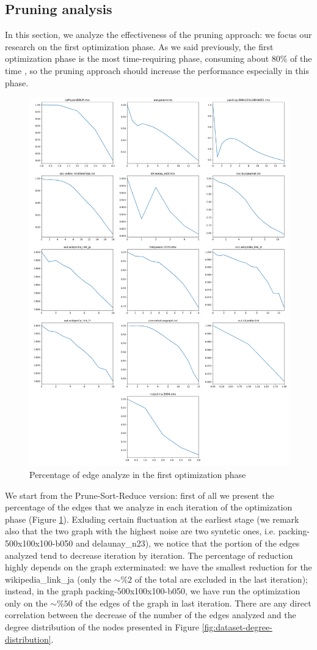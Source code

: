 \subsection{Pruning analysis}
In this section, we analyze the effectiveness of the pruning approach: we focus our research on the first optimization phase. As we said previously, the first optimization phase is the most time-requiring phase, consuming about 80\% of the time \cite{wickramaarachchi2014fast}, so the pruning approach should increase the performance especially in this phase.
\begin{figure}[h]
	\centering
	\includegraphics[width=0.7\linewidth]{0-resources/edge-percentage}
	\caption{Percentage of edge analyze in the first optimization phase}
	\label{fig:edge-percentage}
\end{figure}
We start from the Prune-Sort-Reduce version: first of all we present the percentage of the edges that we analyze in each iteration of the optimization phase (Figure \ref{fig:edge-percentage}). Exluding certain fluctuation at the earliest stage (we remark also that the two graph with the highest noise are two syntetic ones, i.e. packing-500x100x100-b050 and delaunay\_n23), we notice that the portion of the edges analyzed tend to decrease iteration by iteration. The percentage of reduction highly depends on the graph exterminated: we have the smallest reduction for the wikipedia\_link\_ja (only the $\sim\%2$ of the total are excluded in the last iteration); instead, in the graph packing-500x100x100-b050, we have run the optimization only on the $\sim\%50$ of the edges of the graph in last iteration. There are any direct correlation between the decrease of the number of the edges analyzed and the degree distribution of the nodes presented in Figure \ref{fig:dataset-degree-distribution}.
